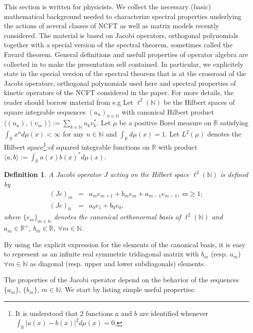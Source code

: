 \documentclass[10pt]{book}
\theoremstyle{break}
\newtheorem{definition}{Definition}
\begin{document}
This section is written for physicists. We collect the necessary (basic) mathematical background needed to characterize spectral properties underlying the actions of several classes of NCFT as well as matrix models recently considered. The material is based on Jacobi operators, orthogonal polynomials together with a special version of the spectral theorem, sometimes called the Favard theorem. General definitions and usefull properties of operator algebra are collected in %
to make the presentation self contained. In particular, we explicitely state in %
the special version of the spectral theorem that is at the crossroad of the Jacobi operators, orthogonal polynomials used here and spectral properties of kinetic operators of the NCFT considered in the paper. For more details, the reader should borrow material from e.g %
Let $\ell^2(\mathbb{N})$ be the Hilbert spaces of square integrable sequences $(u_n)_{n\in\mathbb{N}}$ with canonical Hilbert product $\langle (u_n),(v_m)\rangle:=\sum_{k\in\mathbb{N}}u_kv_k^*$. Let $\mu$ be a positive Borel measure on $\mathbb{R}$ satisfying $\int_\mathbb{R} x^nd\mu(x)<\infty$ for any $n\in\mathbb{N}$ and $\int_\mathbb{R} d\mu(x)=1$. Let $L^2(\mu)$ denotes the Hilbert space{\footnote{It is understood that 2 functions $a$ and $b$ are identified whenever $\int_\mathbb{R}\vert a(x)-b(x) \vert^2d\mu(x)=0$.}} of squared integrable functions on $\mathbb{R}$ with product $\langle a,b\rangle:=\int_\mathbb{R}a(x)b(x)^*d\mu(x)$. 
\begin{definition}
A Jacobi operator $J$ acting on the Hilbert space $\ell^2(\mathbb{N})$ is defined by
\begin{eqnarray}
(Je)_m&=&a_me_{m+1}+b_me_m+a_{m-1}e_{m-1},\ m\ge1;\nonumber\\ 
(Je)_0&=&a_0e_1+b_0e_0,
\end{eqnarray}
where $\{e_m\}_{m\in\mathbb{N}}$ denotes the canonical orthonormal basis of $\ell^2(\mathbb{N})$ and $a_m\in\mathbb{R}^+$, $b_m\in\mathbb{R}$, $\forall m\in\mathbb{N}$.
\end{definition}
By using the explicit expression for the elements of the canonical basis, it is easy to represent %
as an infinite real symmetric tridiagonal matrix with $b_m$ (resp. $a_m$) $\forall m\in\mathbb{N}$ as diagonal (resp. upper and lower subdiagonals) elements. \par 
The properties of the Jacobi operator depend on the behavior of the sequences $\{a_m\}$, $\{b_m\}$, $m\in\mathbb{N}$. We start by listing simple useful properties:
\end{document}
